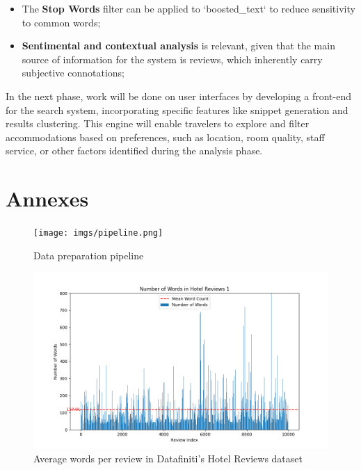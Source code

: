 \documentclass[sigconf]{acmart}
\begin{document}
\begin{itemize}
    \item The \textbf{Stop Words} \cite{Solr_Stop_Filter} filter can be applied to `boosted\_text` to reduce sensitivity to common words;
    \item \textbf{Sentimental and contextual analysis} is relevant, given that the main source of information for the system is reviews, which inherently carry subjective connotations;
\end{itemize}
    
In the next phase, work will be done on user interfaces by developing a front-end for the search system, incorporating specific features like snippet generation and results clustering. This engine will enable travelers to explore and filter accommodations based on preferences, such as location, room quality, staff service, or other factors identified during the analysis phase.

\nocite{*}
\def\BibTex{BibTeX}


\appendix

\section{Annexes}

\begin{figure}[h]
  \centering
  \texttt{[image: imgs/pipeline.png]}
  \caption{Data preparation pipeline}
  \label{fig:pipeline}
\end{figure}

\begin{figure}[H]
  \centering
  \includegraphics[width=\linewidth]{imgs/word_count_1.png}
  \caption{Average words per review in Datafiniti's Hotel Reviews dataset}
  \label{fig:reviewWords1}
\end{figure}
\end{document}
